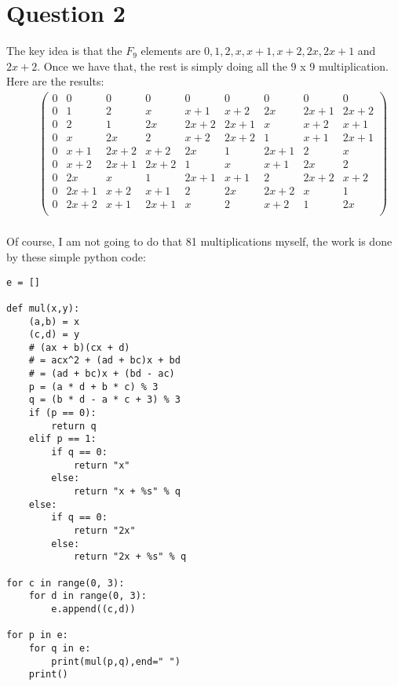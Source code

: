 \section*{Question 2}
The key idea is that the $ F_9 $ elements are $ 0, 1, 2, x, x + 1, x + 2, 2x, 2x + 1 $ and $ 2x + 2$. Once we have that, the rest is simply doing all the 9 x 9 multiplication. Here are the results:
\begin{eqnarray*}
  & & \left(
        \begin{array}{ccccccccc}
0 & 0 & 0 & 0 & 0 & 0 & 0 & 0 & 0 \\
0 & 1 & 2 & x & x + 1 & x + 2 & 2x & 2x + 1 & 2x + 2 \\
0 & 2 & 1 & 2x & 2x + 2 & 2x + 1 & x & x + 2 & x + 1 \\
0 & x & 2x & 2 & x + 2 & 2x + 2 & 1 & x + 1 & 2x + 1 \\
0 & x + 1 & 2x + 2 & x + 2 & 2x & 1 & 2x + 1 & 2 & x \\
0 & x + 2 & 2x + 1 & 2x + 2 & 1 & x & x + 1 & 2x & 2 \\
0 & 2x & x & 1 & 2x + 1 & x + 1 & 2 & 2x + 2 & x + 2 \\
0 & 2x + 1 & x + 2 & x + 1 & 2 & 2x & 2x + 2 & x & 1 \\
0 & 2x + 2 & x + 1 & 2x + 1 & x & 2 & x + 2 & 1 & 2x \\
        \end{array}
      \right) \\
\end{eqnarray*}

Of course, I am not going to do that 81 multiplications myself, the work is done by these simple python code:

\begin{verbatim}
e = []

def mul(x,y):
    (a,b) = x
    (c,d) = y
    # (ax + b)(cx + d)
    # = acx^2 + (ad + bc)x + bd
    # = (ad + bc)x + (bd - ac)
    p = (a * d + b * c) % 3
    q = (b * d - a * c + 3) % 3
    if (p == 0):
        return q
    elif p == 1:
        if q == 0:
            return "x"
        else:
            return "x + %s" % q
    else:
        if q == 0:
            return "2x"
        else:
            return "2x + %s" % q

for c in range(0, 3):
    for d in range(0, 3):
        e.append((c,d))

for p in e:
    for q in e:
        print(mul(p,q),end=" ")
    print()

\end{verbatim}